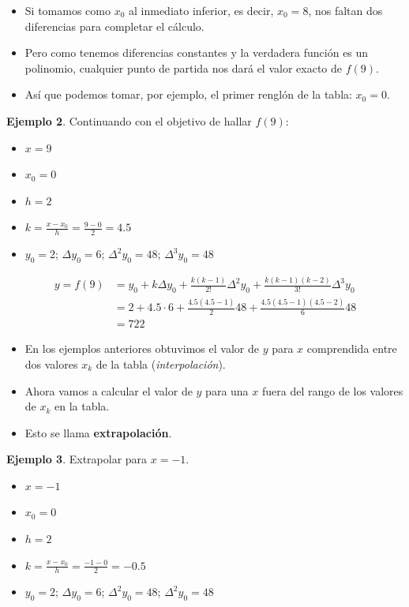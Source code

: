 \documentclass[openany]{book}
\providecommand{\tightlist}{%
  \setlength{\itemsep}{0pt}\setlength{\parskip}{0pt}}
\begin{document}
\begin{itemize}
\tightlist
\item
  Si tomamos como \(x_0\) al inmediato inferior, es decir, \(x_0 = 8\), nos faltan dos diferencias para completar el cálculo.
\item
  Pero como tenemos diferencias constantes y la verdadera función es un polinomio, cualquier punto de partida nos dará el valor exacto de \(f(9)\).
\item
  Así que podemos tomar, por ejemplo, el primer renglón de la tabla: \(x_0=0\).
\end{itemize}

\textbf{Ejemplo 2}. Continuando con el objetivo de hallar \(f(9)\):

\begin{itemize}
\tightlist
\item
  \(x = 9\)
\item
  \(x_0 = 0\)
\item
  \(h = 2\)
\item
  \(k = \frac{x-x_0}{h} = \frac{9-0}{2} = 4.5\)
\item
  \(y_0 = 2\); \(\Delta y_0 = 6\); \(\Delta^2 y_0 = 48\); \(\Delta^3 y_0 = 48\)
\end{itemize}

\[
\begin{aligned}
y = f(9) &= y_0 + k \Delta y_0 + \frac{k(k-1)}{2!}\Delta^2 y_0 + \frac{k(k-1)(k-2)}{3!}\Delta^3 y_0\\
  & = 2 + 4.5 \cdot 6 + \frac{4.5 (4.5-1)}{2} 48 + \frac{4.5 (4.5-1)(4.5-2)}{6} 48 \\
  & = 722
\end{aligned}
\]

\begin{itemize}
\tightlist
\item
  En los ejemplos anteriores obtuvimos el valor de \(y\) para \(x\) comprendida entre dos valores \(x_k\) de la tabla (\emph{interpolación}).
\item
  Ahora vamos a calcular el valor de \(y\) para una \(x\) fuera del rango de los valores de \(x_k\) en la tabla.
\item
  Esto se llama \textbf{extrapolación}.
\end{itemize}

\textbf{Ejemplo 3}. Extrapolar para \(x = -1\).

\begin{itemize}
\tightlist
\item
  \(x = -1\)
\item
  \(x_0 = 0\)
\item
  \(h = 2\)
\item
  \(k = \frac{x-x_0}{h} = \frac{-1-0}{2} = -0.5\)
\item
  \(y_0 = 2\); \(\Delta y_0 = 6\); \(\Delta^2 y_0 = 48\); \(\Delta^2 y_0 = 48\)
\end{itemize}
\end{document}
